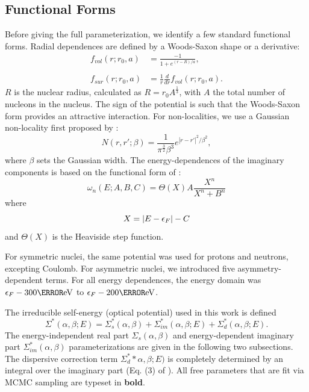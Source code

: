 \documentclass[twocolumn,secnumarabic,amssymb, nobibnotes, aps, prl,
superscriptaddress, nobalancelastpage, draft]{revtex4}
\begin{document}
\subsection{Functional Forms}
Before giving the full parameterization, we identify a few standard functional
forms. Radial dependences are defined by a Woods-Saxon shape or a derivative:
\begin{equation} \label{WoodsSaxon}
    \begin{split}
        f_{vol}(r; r_{0}, a) & = \frac{-1}{1+e^{(r-R)/a}},\\
        \\
        f_{sur}(r; r_{0}, a) & = \frac{1}{r}\frac{d}{dr}f_{vol}(r; r_{0}, a).
    \end{split}
\end{equation}
$R$ is the nuclear radius, calculated as $R = r_{0}A^{\frac{1}{3}}$, with $A$ the total number of
nucleons in the nucleus. The sign of the potential is such that the Woods-Saxon form
provides an attractive interaction. For non-localities, we use a Gaussian
non-locality first proposed by \cite{Perey1962}:
\begin{equation}
    N(r, r';\beta) = \frac{1}{\pi^{\frac{3}{2}}\beta^{3}}
    e^{|r-r'|^{2}/{\beta^{2}}},
\end{equation}
where $\beta$ sets the Gaussian width.
The energy-dependences of the imaginary components is based on the functional form of \cite{Charity2006}:
\begin{equation} \label{omega}
    \omega_{n}(E; A, B, C) = \Theta(X)A\frac{X^{n}}{X^{n}+B^{n}}
\end{equation}
where
\begin{equation*}
    X = |E-\epsilon_{F}|-C\\
\end{equation*}
and $\Theta(X)$ is the Heaviside step function. 

For symmetric nuclei, the same potential was used for protons and neutrons,
excepting Coulomb. For asymmetric nuclei, we introduced five asymmetry-dependent terms.
For all energy dependences, the energy domain was $\epsilon_{F}-300
\mega\electronvolt$ to $\epsilon_{F}-200 \mega\electronvolt$.

The irreducible self-energy (optical potential) used in this work is defined
\begin{equation} \label{SelfEnergyBreakdown}
    \Sigma^{*}(\alpha,\beta;E) =  \Sigma_{s}^{*}(\alpha,\beta) + \Sigma_{im}^{*}(\alpha,\beta;E)
    + \Sigma_{d}^{*}(\alpha,\beta;E).
\end{equation}
The energy-independent real part $\Sigma_{s}(\alpha,\beta)$ and 
energy-dependent imaginary part $\Sigma_{im}^{*}(\alpha,\beta)$
parameterizations are given in the following two subsections. The
dispersive correction term $\Sigma_{d}^{*}*\alpha,\beta;E)$ is completely
determined by an integral over the imaginary part (Eq. (3) of
\cite{Mahzoon2014}). All free parameters that are fit via MCMC sampling are
typeset in \textbf{bold}.
\end{document}
